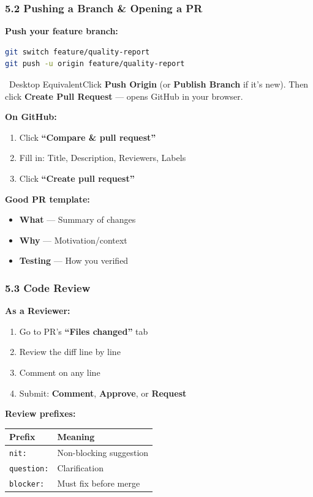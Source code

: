 \documentclass{beamer}
\newcommand{\desktoptip}[1]{\begin{block}{\faMousePointer\ Desktop Equivalent}#1\end{block}}
\begin{document}
\begin{frame}[fragile]
\frametitle{5.2 Pushing a Branch \& Opening a PR}

\textbf{Push your feature branch:}
\begin{lstlisting}[language=bash]
git switch feature/quality-report
git push -u origin feature/quality-report
\end{lstlisting}

\desktoptip{Click \textbf{Push Origin} (or \textbf{Publish Branch} if it's new). Then click \textbf{Create Pull Request} --- opens GitHub in your browser.}

\vspace{1mm}
\textbf{On GitHub:}
\begin{enumerate}
    \tiny
    \item Click \textbf{``Compare \& pull request''}
    \item Fill in: Title, Description, Reviewers, Labels
    \item Click \textbf{``Create pull request''}
\end{enumerate}

\vspace{1mm}
\textbf{Good PR template:}
\begin{itemize}
    \tiny
    \item \textbf{What} --- Summary of changes
    \item \textbf{Why} --- Motivation/context
    \item \textbf{Testing} --- How you verified
\end{itemize}
\end{frame}

\begin{frame}
\frametitle{5.3 Code Review}

\textbf{As a Reviewer:}
\begin{enumerate}
    \item Go to PR's \textbf{``Files changed''} tab
    \item Review the diff line by line
    \item Comment on any line
    \item Submit: \textbf{Comment}, \textbf{Approve}, or \textbf{Request}
\end{enumerate}

\vspace{2mm}
\textbf{Review prefixes:}
\begin{table}[h]
\centering
\tiny
\begin{tabular}{ll}
\toprule
\textbf{Prefix} & \textbf{Meaning} \\
\midrule
\texttt{nit:} & Non-blocking suggestion \\
\texttt{question:} & Clarification \\
\texttt{blocker:} & Must fix before merge \\
\bottomrule
\end{tabular}
\end{table}
\end{frame}
\end{document}
